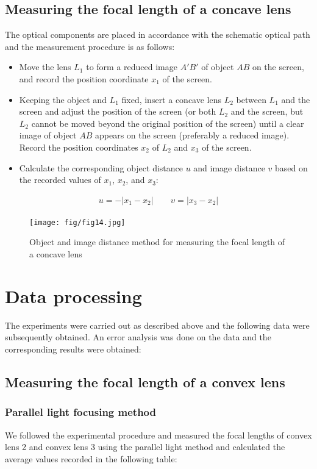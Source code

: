 \documentclass[UTF8]{article}
\begin{document}
   \subsection{Measuring the focal length of a concave lens}
   The optical components are placed in accordance with the schematic optical path and the measurement procedure is as follows:
   \begin{itemize}
   \item Move the lens $L_1$ to form a reduced image $A'B'$ of object $AB$ on the screen, and record the position coordinate $x_1$ of the screen.
   \item Keeping the object and $L_1$ fixed, insert a concave lens $L_2$ between $L_1$ and the screen and adjust the position of the screen (or both $L_2$ and the screen, but $L_2$ cannot be moved beyond the original position of the screen) until a clear image of object $AB$ appears on the screen (preferably a reduced image). Record the position coordinates $x_2$ of $L_2$ and $x_3$ of the screen.
   \item Calculate the corresponding object distance $u$ and image distance $v$ based on the recorded values of $x_1$, $x_2$, and $x_3$:
   \end{itemize}
    \begin{eqnarray}
    u  =  -\left | x_1-x_2 \right | \qquad \upsilon  =  \left | x_3-x_2 \right |  
    \end{eqnarray}
    \begin{figure}[H]
                	     	\centering
                	     	\texttt{[image: fig/fig14.jpg]}
                	     	\caption{Object and image distance method for measuring the focal length of a concave lens}
                	     	\label{figure.14}
             \end{figure}
    
    
	
	\section{Data processing}
	The experiments were carried out as described above and the following data were subsequently obtained. An error analysis was done on the data and the corresponding results were obtained:
	\subsection{Measuring the focal length of a convex lens}
	\subsubsection{Parallel light focusing method}
   We followed the experimental procedure and measured the focal lengths of convex lens 2 and convex lens 3 using the parallel light method and calculated the average values recorded in the following table:
   
\end{document}
